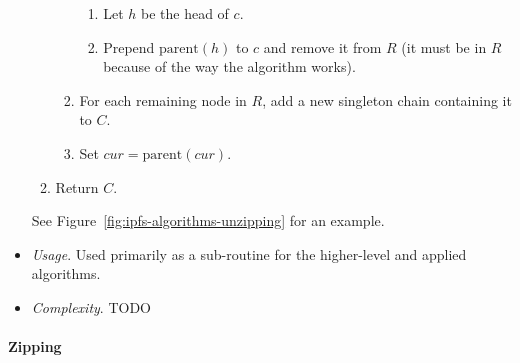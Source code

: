 \begin{itemize}
\begin{enumerate}
\begin{enumerate}
\begin{enumerate}

\item Let $h$ be the head of $c$.
\item Prepend $\mbox{parent}(h)$ to $c$ and remove it from $R$ (it must be in $R$ because of the way the algorithm works).

\end{enumerate}

\item For each remaining node in $R$, add a new singleton chain containing it to $C$.
\item Set $cur = \mbox{parent}(cur)$.

\end{enumerate}

\item Return $C$.

\end{enumerate}

See Figure~\ref{fig:ipfs-algorithms-unzipping} for an example.


\item \emph{Usage}. Used primarily as a sub-routine for the higher-level and applied algorithms.

\item \emph{Complexity}. TODO

\end{itemize}

\paragraph{Zipping}

